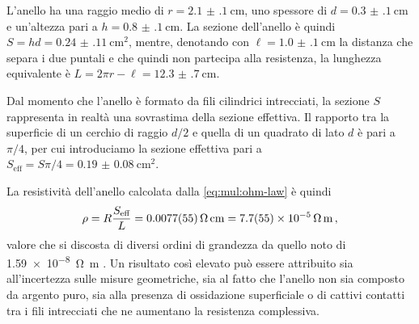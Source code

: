             L'anello ha una raggio medio di $r = \SI{2.1(1)}{\centi\meter}$, uno spessore di $d = \SI{0.3(1)}{\centi\meter}$ e un'altezza pari a $h = \SI{0.8(1)}{\centi\meter}$. La sezione dell'anello è quindi $S = hd = \SI{0.24(11)}{\centi\meter\squared}$, mentre, denotando con $\ell = \SI{1.0(1)}{\centi\meter}$ la distanza che separa i due puntali e che quindi non partecipa alla resistenza, la lunghezza equivalente è $L = 2\pi r - \ell = \SI{12.3(7)}{\centi\meter}$.

            Dal momento che l'anello è formato da fili cilindrici intrecciati, la sezione $S$ rappresenta in realtà una sovrastima della sezione effettiva. Il rapporto tra la superficie di un cerchio di raggio $d/2$ e quella di un quadrato di lato $d$ è pari a $\pi / 4$, per cui introduciamo la sezione effettiva pari a $S_\text{eff} = S \pi / \num{4} = \SI{0.19(8)}{\centi\meter\squared}$.
            
            La resistività dell'anello calcolata dalla \eqref{eq:mul:ohm-law} è quindi
            \begin{equation*}
                \rho = R\frac{S_\text{eff}}{L} = \SI{0.0077(55)}{\ohm\centi\meter} = \SI{7.7(55)e-5}{\ohm\meter}
                \mycomma
            \end{equation*}
            valore che si discosta di diversi ordini di grandezza da quello noto di \SI{1.59e-8}{\ohm\meter} \cite{Griffiths2012-qz}. Un risultato così elevato può essere attribuito sia all'incertezza sulle misure geometriche, sia al fatto che l'anello non sia composto da argento puro, sia alla presenza di ossidazione superficiale o di cattivi contatti tra i fili intrecciati che ne aumentano la resistenza complessiva.
            


